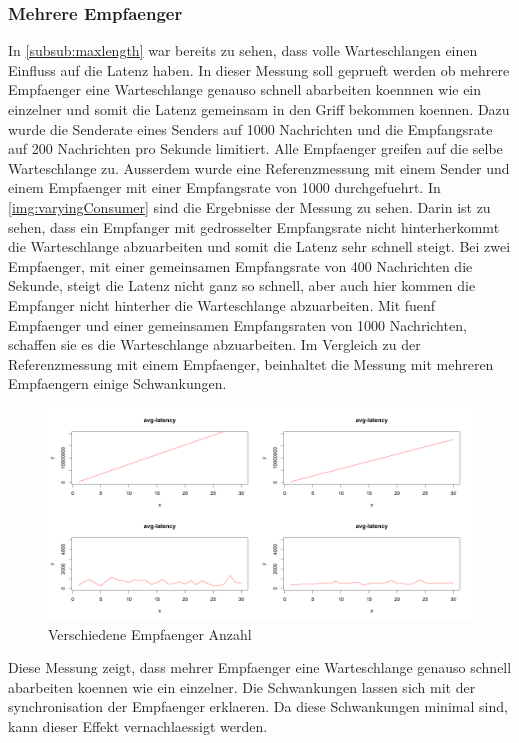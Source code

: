 \subsubsection{Mehrere Empfaenger}
In \autoref{subsub:maxlength} war bereits zu sehen, dass volle Warteschlangen einen Einfluss auf die Latenz haben. In dieser Messung soll geprueft werden ob mehrere Empfaenger eine Warteschlange genauso schnell abarbeiten koennnen wie ein einzelner und somit die Latenz gemeinsam in den Griff bekommen koennen. Dazu wurde die Senderate eines Senders auf 1000 Nachrichten und die Empfangsrate auf 200 Nachrichten pro Sekunde limitiert. Alle Empfaenger greifen auf die selbe Warteschlange zu. Ausserdem wurde eine Referenzmessung mit einem Sender und einem Empfaenger mit einer Empfangsrate von 1000 durchgefuehrt.
In \autoref{img:varyingConsumer} sind die Ergebnisse der Messung zu sehen. Darin ist zu sehen, dass ein Empfanger mit gedrosselter Empfangsrate nicht hinterherkommt die Warteschlange abzuarbeiten und somit die Latenz sehr schnell steigt. Bei zwei Empfaenger, mit einer gemeinsamen Empfangsrate von 400 Nachrichten die Sekunde, steigt die Latenz nicht ganz so schnell, aber auch hier kommen die Empfanger nicht hinterher die Warteschlange abzuarbeiten. Mit fuenf Empfaenger und einer gemeinsamen Empfangsraten von 1000 Nachrichten, schaffen sie es die Warteschlange abzuarbeiten. Im Vergleich zu der Referenzmessung mit einem Empfaenger, beinhaltet die Messung mit mehreren Empfaengern einige Schwankungen.
\begin{figure}
\center
  \includegraphics[width=1\textwidth]{images/measurement/varying-consumer.png}
  \caption{Verschiedene Empfaenger Anzahl}
  \label{img:varyingConsumer}
\end{figure}
Diese Messung zeigt, dass mehrer Empfaenger eine Warteschlange genauso schnell abarbeiten koennen wie ein einzelner. Die Schwankungen lassen sich mit der synchronisation der Empfaenger erklaeren. Da diese Schwankungen minimal sind, kann dieser Effekt vernachlaessigt werden.

